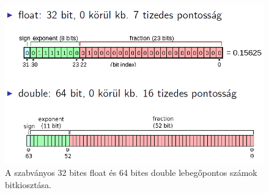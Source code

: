 \documentclass[12pt]{article}
\theoremstyle{plain}
\begin{document}
\begin{figure}
	\centering
	\includegraphics[width=0.7\linewidth]{media/IEEE754}
	\caption{A szabványos 32 bites float és 64 bites double lebegőpontos számok bitkiosztása.}
	\label{fig:ieee754}
\end{figure}






\end{document}
